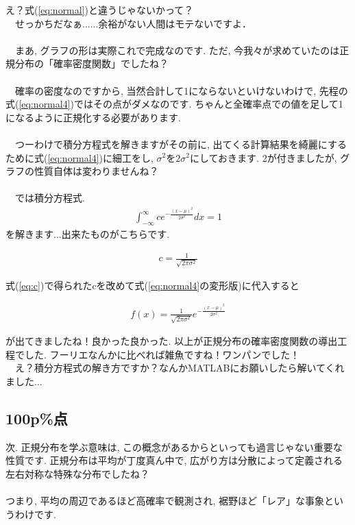 \documentclass[11pt,a4paper,uplatex]{ujreport} 	%
\begin{document}
え？式(\ref{eq:normal})と違うじゃないかって？\\
　せっかちだなぁ......余裕がない人間はモテないですよ．\\
\\
　まあ, グラフの形は実際これで完成なのです. ただ, 今我々が求めていたのは正規分布の「確率密度関数」でしたね？\\
\\
　確率の密度なのですから, 当然合計して1にならないといけないわけで, 先程の式(\ref{eq:normal4})ではその点がダメなのです. ちゃんと全確率点での値を足して1になるように正規化する必要があります.\\
\\
　つーわけで積分方程式を解きますがその前に, 出てくる計算結果を綺麗にするために式(\ref{eq:normal4})に細工をし, $\sigma^2$を$2\sigma^2$にしておきます. 2が付きましたが, グラフの性質自体は変わりませんね？\\
\\
　では積分方程式.
\begin{align}
\int_{-\infty}^{\infty} c e^{-\frac{(x-\mu)^2}{2\sigma^2}} dx= 1
\end{align}
を解きます...出来たものがこちらです.

\begin{align}
\label{eq:c}
c = \frac{1}{\sqrt{2\pi\sigma^2}}
\end{align}

式(\ref{eq:c})で得られたcを改めて式(\ref{eq:normal4}の変形版)に代入すると

\begin{align}
f(x) = \frac{1}{\sqrt{2\pi\sigma^2}}e^{-\frac{(x-\mu)^2}{2\sigma^2}}
\end{align}

が出てきましたね！良かった良かった. 以上が正規分布の確率密度関数の導出工程でした. フーリエなんかに比べれば雑魚ですね！ワンパンでした！\\
　え？積分方程式の解き方ですか？なんかMATLABにお願いしたら解いてくれました...

\subsection{100p\%点}
次. 正規分布を学ぶ意味は, この概念があるからといっても過言じゃない重要な性質です. 正規分布は平均が丁度真ん中で, 広がり方は分散によって定義される左右対称な特殊な分布でしたね？\\\\

つまり, 平均の周辺であるほど高確率で観測され, 裾野ほど「レア」な事象というわけです.\\\\
\end{document}
